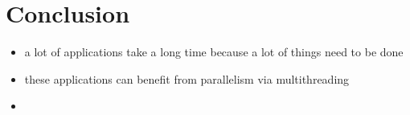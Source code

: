 \documentclass{article}
\begin{document}
\section{Conclusion}

    \begin{itemize}
        \item a lot of applications take a long time because a lot of things need to be done
        \item these applications can benefit from parallelism via multithreading
        \item 
    \end{itemize}
\end{document}
